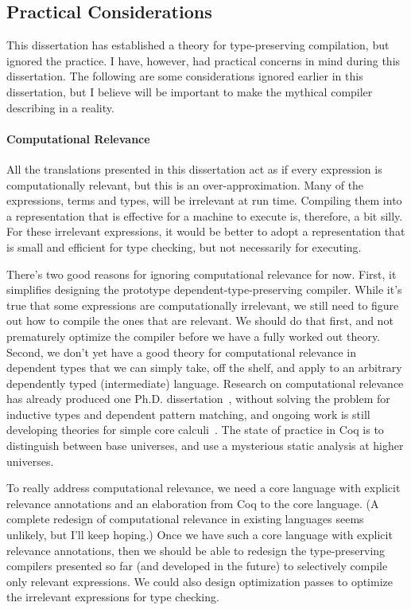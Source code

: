 \subsection{Practical Considerations}
This dissertation has established a theory for type-preserving compilation, but
ignored the practice.
I have, however, had practical concerns in mind during this dissertation.
The following are some considerations ignored earlier in this dissertation,
but I believe will be important to make the mythical compiler describing in
 a reality.

\paragraph{Computational Relevance}
All the translations presented in this dissertation act as if every expression
is computationally relevant, but this is an over-approximation.
Many of the expressions, terms and types, will be irrelevant at run time.
Compiling them into a representation that is effective for a machine to execute
is, therefore, a bit silly.
For these irrelevant expressions, it would be better to adopt a representation
that is small and efficient for type checking, but not necessarily for
executing.

There's two good reasons for ignoring computational relevance for now.
First, it simplifies designing the prototype dependent-type-preserving compiler.
While it's true that some expressions are computationally irrelevant, we still
need to figure out how to compile the ones that are relevant.
We should do that first, and not prematurely optimize the compiler before we
have a fully worked out theory.
Second, we don't yet have a good theory for computational relevance in dependent
types that we can simply take, off the shelf, and apply to an arbitrary
dependently typed (intermediate) language.
Research on computational relevance has already produced one Ph.D.
dissertation~\cite{mishra-linger2008:phd}, without solving the problem for
inductive types and dependent pattern matching, and ongoing work is still
developing theories for simple core
calculi~\cite{tejiscak2015:dtp-draft,nuyts2018}.
The state of practice in Coq is to distinguish between base universes, and use a
mysterious static analysis at higher universes.

To really address computational relevance, we need a core language with explicit
relevance annotations and an elaboration from Coq to the core language.
(A complete redesign of computational relevance in existing languages seems
unlikely, but I'll keep hoping.)
Once we have such a core language with explicit relevance annotations, then we
should be able to redesign the type-preserving compilers presented so far (and
developed in the future) to selectively compile only relevant expressions.
We could also design optimization passes to optimize the irrelevant expressions
for type checking.

